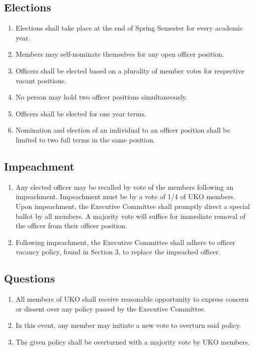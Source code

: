 \documentclass[12pt,executivepaper]{article}
\begin{document}
\subsection{Elections}
\begin{enumerate}
    \item Elections shall take place at the end of Spring Semester for every
          academic year.
    \item Members may self-nominate themselves for any open officer position.
    \item Officers shall be elected based on a plurality of member votes for
          respective vacant positions.
    \item No person may hold two officer positions simultaneously.
    \item Officers shall be elected for one year terms.
    \item Nomination and election of an individual to an officer position shall
          be limited to two full terms in the same position.
\end{enumerate}

\subsection{Impeachment}
\begin{enumerate}
    \item Any elected officer may be recalled by vote of the members following an
          impeachment. Impeachment must be by a vote of 1/4 of UKO members.
          Upon impeachment, the Executive Committee shall promptly direct a special
          ballot by all members. A majority vote will suffice for immediate removal
          of the officer from their officer position.
    \item Following impeachment, the Executive Committee shall adhere to
          officer vacancy policy, found in Section 3, to replace the impeached
          officer.
\end{enumerate}

\subsection{Questions}
\begin{enumerate}
    \item All members of UKO shall receive reasonable opportunity to express
          concern or dissent over any policy passed by the Executive Committee.
    \item In this event, any member may initiate a new vote to overturn said
          policy.
    \item The given policy shall be overturned with a majority vote by UKO
          members.
\end{enumerate}
\end{document}
